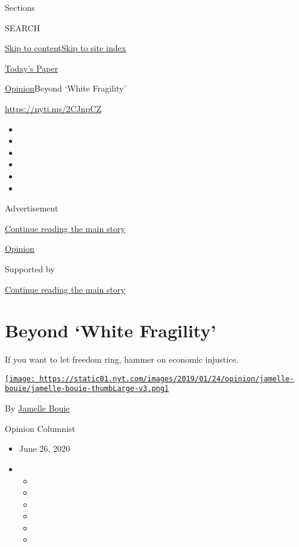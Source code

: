 Sections

SEARCH

\protect\hyperlink{site-content}{Skip to
content}\protect\hyperlink{site-index}{Skip to site index}

\href{https://myaccount.nytimes.com/auth/login?response_type=cookie\&client_id=vi}{}

\href{https://www.nytimes.com/section/todayspaper}{Today's Paper}

\href{/section/opinion}{Opinion}\textbar{}Beyond `White Fragility'

\href{https://nyti.ms/2CJnpCZ}{https://nyti.ms/2CJnpCZ}

\begin{itemize}
\item
\item
\item
\item
\item
\item
\end{itemize}

Advertisement

\protect\hyperlink{after-top}{Continue reading the main story}

\href{/section/opinion}{Opinion}

Supported by

\protect\hyperlink{after-sponsor}{Continue reading the main story}

\hypertarget{beyond-white-fragility}{%
\section{Beyond `White Fragility'}\label{beyond-white-fragility}}

If you want to let freedom ring, hammer on economic injustice.

\href{https://www.nytimes.com/column/jamelle-bouie}{\texttt{[image: https://static01.nyt.com/images/2019/01/24/opinion/jamelle-bouie/jamelle-bouie-thumbLarge-v3.png]}}

By \href{https://www.nytimes.com/column/jamelle-bouie}{Jamelle Bouie}

Opinion Columnist

\begin{itemize}
\item
  June 26, 2020
\item
  \begin{itemize}
  \item
  \item
  \item
  \item
  \item
  \item
  \end{itemize}
\end{itemize}

